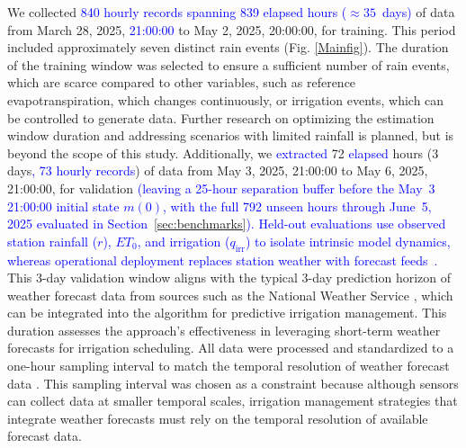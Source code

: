 \documentclass[pdflatex,sn-nature]{sn-jnl}%
\theoremstyle{thmstyleone}%
\theoremstyle{thmstyletwo}%
\theoremstyle{thmstylethree}%
\begin{document}
We collected \textcolor{blue}{840 hourly records spanning 839 elapsed hours ($\approx 35$~days)} of data from March 28, 2025, \textcolor{blue}{21:00:00} to May 2, 2025, 20:00:00, for training. This period included approximately seven distinct rain events (Fig. \ref{Mainfig}). The duration of the training window was selected to ensure a sufficient number of rain events, which are scarce compared to other variables, such as reference evapotranspiration, which changes continuously, or irrigation events, which can be controlled to generate data. Further research on optimizing the estimation window duration and addressing scenarios with limited rainfall is planned, but is beyond the scope of this study.
Additionally, we \textcolor{blue}{extracted} 72 \textcolor{blue}{elapsed} hours (3 days\textcolor{blue}{, 73 hourly records}) of data from May 3, 2025, 21:00:00 to May 6, 2025, 21:00:00, for validation \textcolor{blue}{(leaving a 25-hour separation buffer before the May~3 21:00:00 initial state $m(0)$, with the full 792 unseen hours through June~5, 2025 evaluated in Section~\ref{sec:benchmarks}). Held-out evaluations use observed station rainfall ($r$), $ET_0$, and irrigation ($q_{\mathrm{irr}}$) to isolate intrinsic model dynamics, whereas operational deployment replaces station weather with forecast feeds~\cite{NWS2024}.} This 3-day validation window aligns with the typical 3-day prediction horizon of weather forecast data from sources such as the National Weather Service \cite{NWS2024}, which can be integrated into the algorithm for predictive irrigation management. This duration assesses the approach's effectiveness in leveraging short-term weather forecasts for irrigation scheduling.
All data were processed and standardized to a one-hour sampling interval to match the temporal resolution of weather forecast data \cite{NWS2024}. This sampling interval was chosen as a constraint because although sensors can collect data at smaller temporal scales, irrigation management strategies that integrate weather forecasts must rely on the temporal resolution of available forecast data.
\end{document}
